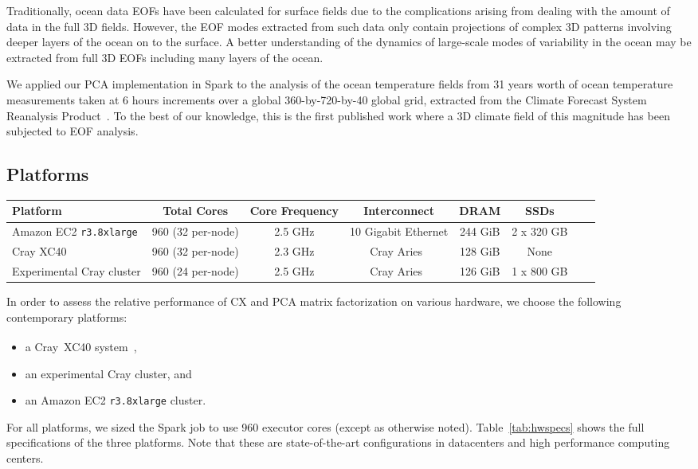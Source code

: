 Traditionally, ocean data EOFs have been calculated for surface fields due to
the complications arising from dealing with the amount of data in the full 3D fields. 
However, the EOF modes extracted from such data only
contain projections of complex 3D patterns involving deeper layers of the
ocean on to the surface. A better understanding of the dynamics of large-scale
modes of variability in the ocean may be extracted from full 3D EOFs including
many layers of the ocean. 

We applied our PCA implementation in Spark to the analysis of the 
ocean temperature fields from 31 years worth of ocean temperature measurements taken 
at 6 hours increments over a global 360-by-720-by-40 global grid, extracted from
the Climate Forecast System Reanalysis Product~\cite{Saha:2010ji}. To the best of our knowledge, this is the
first published work where a 3D climate field of this magnitude has been subjected to 
EOF analysis.

\subsection{Platforms}

  \begin{table*}
    \begin{center}
    \begin{tabular}{| l | c | c | c | c | c | c | c |}
    \toprule
    \textbf{Platform} & \textbf{Total Cores} & \textbf{Core Frequency} & \textbf{Interconnect} & \textbf{DRAM} & \textbf{SSDs} \\
    \midrule
    Amazon EC2 \texttt{r3.8xlarge} & 960 (32 per-node) & 2.5 GHz & 10 Gigabit Ethernet & 244 GiB & 2 x 320 GB \\
    \midrule
    Cray XC40 & 960 (32 per-node) & 2.3 GHz & Cray Aries~\cite{alverson2012cray,craycascadesc12} & 128 GiB & None \\
    \midrule
    Experimental Cray cluster & 960 (24 per-node) & 2.5 GHz & Cray Aries~\cite{alverson2012cray,craycascadesc12} & 126 GiB & 1 x 800 GB \\
    \bottomrule
    \end{tabular}
    \end{center}
    \caption{Specifications of the three hardware platforms used in these performance experiments.}
    \label{tab:hwspecs}
  \end{table*}

 In order to assess the relative performance of CX and PCA matrix factorization on various hardware, we choose the following contemporary platforms:
 \begin{itemize}
 \item a Cray\textregistered~XC40\textsuperscript{\tiny\texttrademark}
 system~\cite{alverson2012cray,craycascadesc12},
 \item an experimental Cray cluster, and
 \item an Amazon EC2 \texttt{r3.8xlarge} cluster.
 \end{itemize}

 For all platforms, we sized the Spark job to use 960 executor cores (except as
 otherwise noted).  Table~\ref{tab:hwspecs} shows the full specifications of
 the three platforms. Note that these are state-of-the-art configurations in
 datacenters and high performance computing centers. 

